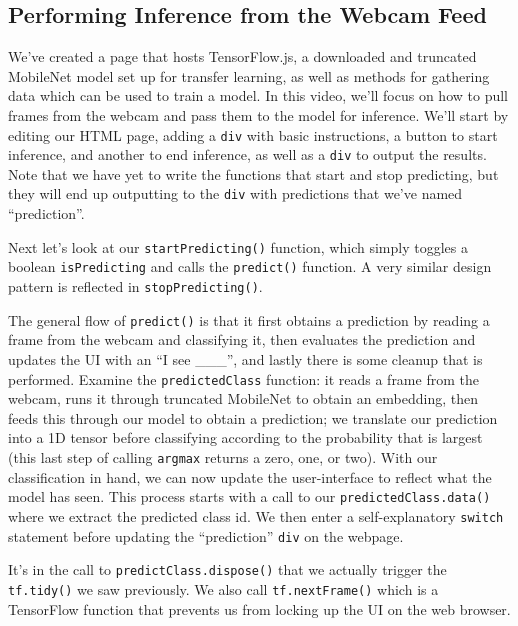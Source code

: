 \documentclass[12pt]{article}
\begin{document}
\subsection{Performing Inference from the Webcam Feed}
We've created a page that hosts TensorFlow.js, a downloaded and truncated MobileNet
model set up for transfer learning, as well as methods for gathering data which can be used
to train a model. In this video, we'll focus on how to pull frames from the webcam and pass
them to the model for inference. We'll start by editing our HTML page, adding a \texttt{div}
with basic instructions, a button to start inference, and another to end inference, as well
as a \texttt{div} to output the results. Note that we have yet to write the functions that start and stop predicting,
but they will end up outputting to the \texttt{div} with predictions that we've named ``prediction''.


Next let's look at our \texttt{startPredicting()} function, which simply toggles a boolean \texttt{isPredicting}
and calls the \texttt{predict()} function. A very similar design pattern is reflected in \texttt{stopPredicting()}.


The general flow of \texttt{predict()} is that it first obtains a prediction by reading a frame from the
webcam and classifying it, then evaluates the prediction and updates the UI with an ``I see \_\_\_'',
and lastly there is some cleanup that is performed. Examine the \texttt{predictedClass} function: it reads a frame from
the webcam, runs it through truncated MobileNet to obtain an embedding, then feeds this through our model to obtain a prediction;
we translate our prediction into a 1D tensor before classifying according to the probability that is largest (this last step of calling \texttt{argmax} returns a zero, one, or two). With our classification in hand, we can now update the user-interface to reflect
what the model has seen. This process starts with a call to our \texttt{predictedClass.data()} where we extract the predicted
class id. We then enter a self-explanatory \texttt{switch} statement before updating the ``prediction'' \texttt{div} on the webpage.

It's in the call to \texttt{predictClass.dispose()} that we actually trigger the \texttt{tf.tidy()} we saw previously. We also call
\texttt{tf.nextFrame()} which is a TensorFlow function that prevents us from locking up the UI on the web browser.
\end{document}

